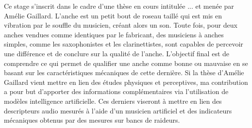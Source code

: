 
Ce stage s'inscrit dans le cadre d'une thèse en cours intitulée ... et menée par Amélie Gaillard. L'anche est un petit bout de roseau taillé qui est mis en vibration par le souffle du musicien, créant alors un son. Toute fois, pour deux anches vendues comme identiques par le fabricant, des musiciens à anches simples, comme les saxophonistes et les clarinettistes, sont capables de percevoir une différence et de conclure sur la qualité de l'anche. L'objectif final est de comprendre ce qui permet de qualifier une anche comme bonne ou mauvaise en se basant sur les caractéristiques mécaniques de cette dernière. Si la thèse d'Amélie Gaillard vient mettre en lien des études physiques et perceptives, ma contribution a pour but d'apporter des informations complémentaires via l'utilisation de modèles intelligence artificielle. Ces derniers viseront à mettre en lien des descripteurs audio mesurés à l'aide d'un musicien artificiel et des indicateurs mécaniques obtenus par des mesures sur bancs de raideurs. 

